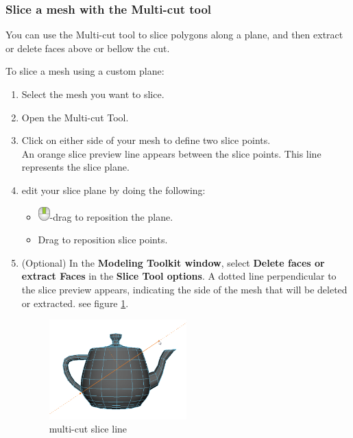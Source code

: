 \subsubsection{Slice a mesh with the Multi-cut tool}
You can use the Multi-cut tool to slice polygons along a plane, and then extract or delete faces above or bellow the cut.

To slice a mesh using a custom plane:
\begin{enumerate}
	\item Select the mesh you want to slice.
	\item Open the Multi-cut Tool.
	\item Click on either side of your mesh to define two slice points.\\
	An orange slice preview line appears between the slice points. This line represents the slice plane.
	\item edit your slice plane by doing the following:
	\begin{itemize}
		\item \includegraphics[scale=0.6]{"figures/reposition using mouse"}-drag to reposition the plane.
		\item Drag to reposition slice points.
	\end{itemize}
	\item (Optional) In the \textbf{Modeling Toolkit window}, select \textbf{Delete faces or extract Faces} in the \textbf{Slice Tool options}. A dotted line perpendicular to the slice preview appears, indicating the side of the mesh that will be deleted or extracted. see figure \ref{fig: multi-cut slice line}.
	
	\begin{figure}[h]
		\centering
		\includegraphics[width=0.5\textwidth]{"figures/multi-cut slice line"}
		\caption{multi-cut slice line}\label{fig: multi-cut slice line}
	\end{figure}
	

\end{enumerate}
